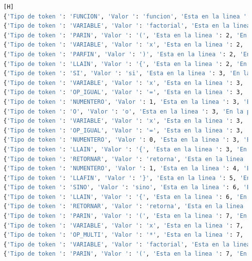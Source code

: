 \documentclass{article}
\begin{document}

\begin{lstlisting}[language=bash,caption={Tokens de Factorial}][H]
{'Tipo de token ': 'FUNCION', 'Valor ': 'funcion', 'Esta en la linea ': 2, 'En la posición ': 18}
{'Tipo de token ': 'VARIABLE', 'Valor ': 'factorial', 'Esta en la linea ': 2, 'En la posición ': 26}
{'Tipo de token ': 'PARIN', 'Valor ': '(', 'Esta en la linea ': 2, 'En la posición ': 35}
{'Tipo de token ': 'VARIABLE', 'Valor ': 'x', 'Esta en la linea ': 2, 'En la posición ': 36}
{'Tipo de token ': 'PARFIN', 'Valor ': ')', 'Esta en la linea ': 2, 'En la posición ': 37}
{'Tipo de token ': 'LLAIN', 'Valor ': '{', 'Esta en la linea ': 2, 'En la posición ': 38}
{'Tipo de token ': 'SI', 'Valor ': 'si', 'Esta en la linea ': 3, 'En la posición ': 44}
{'Tipo de token ': 'VARIABLE', 'Valor ': 'x', 'Esta en la linea ': 3, 'En la posición ': 47}
{'Tipo de token ': 'OP_IGUAL', 'Valor ': '=', 'Esta en la linea ': 3, 'En la posición ': 48}
{'Tipo de token ': 'NUMENTERO', 'Valor ': 1, 'Esta en la linea ': 3, 'En la posición ': 49}
{'Tipo de token ': 'O', 'Valor ': 'o', 'Esta en la linea ': 3, 'En la posición ': 51}
{'Tipo de token ': 'VARIABLE', 'Valor ': 'x', 'Esta en la linea ': 3, 'En la posición ': 53}
{'Tipo de token ': 'OP_IGUAL', 'Valor ': '=', 'Esta en la linea ': 3, 'En la posición ': 54}
{'Tipo de token ': 'NUMENTERO', 'Valor ': 0, 'Esta en la linea ': 3, 'En la posición ': 55}
{'Tipo de token ': 'LLAIN', 'Valor ': '{', 'Esta en la linea ': 3, 'En la posición ': 56}
{'Tipo de token ': 'RETORNAR', 'Valor ': 'retorna', 'Esta en la linea ': 4, 'En la posición ': 66}
{'Tipo de token ': 'NUMENTERO', 'Valor ': 1, 'Esta en la linea ': 4, 'En la posición ': 74}
{'Tipo de token ': 'LLAFIN', 'Valor ': '}', 'Esta en la linea ': 5, 'En la posición ': 80}
{'Tipo de token ': 'SINO', 'Valor ': 'sino', 'Esta en la linea ': 6, 'En la posición ': 86}
{'Tipo de token ': 'LLAIN', 'Valor ': '{', 'Esta en la linea ': 6, 'En la posición ': 90}
{'Tipo de token ': 'RETORNAR', 'Valor ': 'retorna', 'Esta en la linea ': 7, 'En la posición ': 100}
{'Tipo de token ': 'PARIN', 'Valor ': '(', 'Esta en la linea ': 7, 'En la posición ': 108}
{'Tipo de token ': 'VARIABLE', 'Valor ': 'x', 'Esta en la linea ': 7, 'En la posición ': 109}
{'Tipo de token ': 'OP_MULTI', 'Valor ': '*', 'Esta en la linea ': 7, 'En la posición ': 110}
{'Tipo de token ': 'VARIABLE', 'Valor ': 'factorial', 'Esta en la linea ': 7, 'En la posición ': 111}
{'Tipo de token ': 'PARIN', 'Valor ': '(', 'Esta en la linea ': 7, 'En la posición ': 120}

\end{lstlisting}
\end{document}
